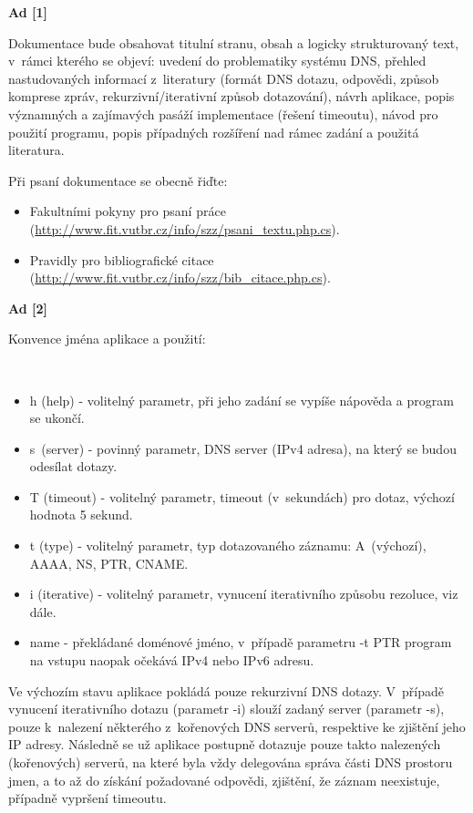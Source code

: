 \documentclass[11pt, a4paper, titlepage]{article}
\begin{document}
\textbf{Ad [1]}

Dokumentace bude obsahovat titulní stranu, obsah a logicky strukturovaný text, v~rámci kterého se objeví: uvedení do problematiky systému DNS, přehled nastudovaných informací z~literatury (formát DNS dotazu, odpovědi, způsob komprese zpráv, rekurzivní/iterativní způsob dotazování), návrh aplikace, popis významných a zajímavých pasáží implementace (řešení timeoutu), návod pro použití programu, popis případných rozšíření nad rámec zadání a použitá literatura.

Při psaní dokumentace se obecně řiďte:

\begin{itemize}
	\item Fakultními pokyny pro psaní práce (\url{http://www.fit.vutbr.cz/info/szz/psani_textu.php.cs}).
	\item Pravidly pro bibliografické citace (\url{http://www.fit.vutbr.cz/info/szz/bib_citace.php.cs}).
\end{itemize}


\textbf{Ad [2]}

Konvence jména aplikace a použití:

 \\

\begin{itemize}
	\item h (help) - volitelný parametr, při jeho zadání se vypíše nápověda a program se ukončí.
	\item s~(server) - povinný parametr, DNS server (IPv4 adresa), na který se budou odesílat dotazy.
	\item T (timeout) - volitelný parametr, timeout (v~sekundách) pro dotaz, výchozí hodnota 5 sekund.
	\item t (type) - volitelný parametr, typ dotazovaného záznamu: A~(výchozí), AAAA, NS, PTR, CNAME.
	\item i (iterative) - volitelný parametr, vynucení iterativního způsobu rezoluce, viz dále.
	\item name - překládané doménové jméno, v~případě parametru -t PTR program na vstupu naopak očekává IPv4 nebo IPv6 adresu.
\end{itemize}

Ve výchozím stavu aplikace pokládá pouze rekurzivní DNS dotazy. V~případě vynucení iterativního dotazu (parametr -i) slouží zadaný server (parametr -s), pouze k~nalezení některého z~kořenových DNS serverů, respektive ke zjištění jeho IP adresy. Následně se už aplikace postupně dotazuje pouze takto nalezených (kořenových) serverů, na které byla vždy delegována správa části DNS prostoru jmen, a to až do získání požadované odpovědi, zjištění, že záznam neexistuje, případně vypršení timeoutu.
\end{document}
